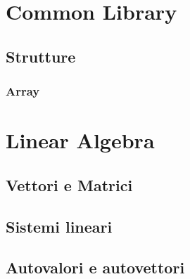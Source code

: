 \documentclass[a4paper, 10pt, twoside]{memoir}
\begin{document}

	\tableofcontents

	\chapter{Common Library}
	\label{chap:common_library}
	
		\section{Strutture}
		\label{sec:strutture}
			\subsection{Array}
			\label{ssec:array}
			
	\chapter{Linear Algebra}
	\label{chap:linear_algebra}
		\section{Vettori e Matrici}
		\section{Sistemi lineari}
		\section{Autovalori e autovettori}
\end{document}
